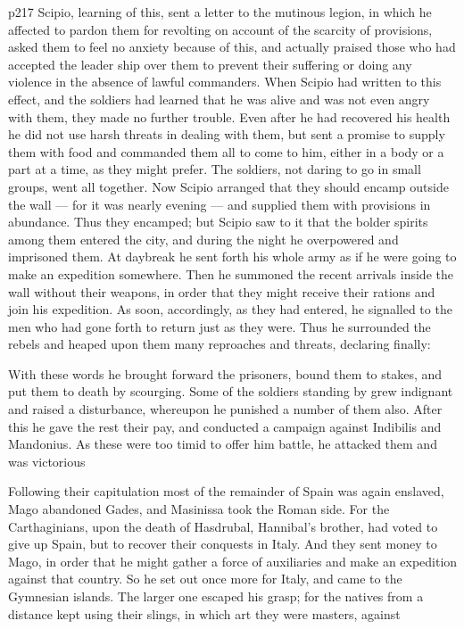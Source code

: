 p217
Scipio, learning of this, sent a letter to the mutinous legion, in which he affected to pardon them for revolting on account of the scarcity of provisions, asked them to feel no anxiety because of this, and actually praised those who had accepted the leader ­ship over them to prevent their suffering or doing any violence in the absence of lawful commanders. When Scipio had written to this effect, and the soldiers had learned that he was alive and was not even angry with them, they made no further trouble. Even after he had recovered his health he did not use harsh threats in dealing with them, but sent a promise to supply them with food and commanded them all to come to him, either in a body or a part at a time, as they might prefer. The soldiers, not daring to go in small groups, went all together. Now Scipio arranged that they should encamp outside the wall \texthebrew{—} for it was nearly evening \texthebrew{—} and supplied them with provisions in abundance. Thus they encamped; but Scipio saw to it that the bolder spirits among them entered the city, and during the night he over­powered and imprisoned them. At daybreak he sent forth his whole army as if he were going to make an expedition somewhere. Then he summoned the recent arrivals inside the wall without their weapons, in order that they might receive their rations and join his expedition. As soon, accordingly, as they had entered, he signalled to the men who had gone forth to return just as they were. Thus he surrounded the rebels and heaped upon them many reproaches and threats, declaring finally:

With these words he brought forward the prisoners, bound them to stakes, and put them to death by scourging. Some of the soldiers standing by grew indignant and raised a disturbance, whereupon he punished a number of them also. After this he gave the rest their pay, and conducted a campaign against Indibilis and Mandonius. As these were too timid to offer him battle, he attacked them and was victorious

Following their capitulation most of the remainder of Spain was again enslaved, Mago abandoned Gades, and Masinissa took the Roman side. For the Carthaginians, upon the death of Hasdrubal, Hannibal's brother, had voted to give up Spain, but to recover their conquests in Italy. And they sent money to Mago, in order that he might gather a force of auxiliaries and make an expedition against that country. So he set out once more for Italy, and came to the Gymnesian islands. The larger one escaped his grasp; for the natives from a distance kept using their slings, in which art they were masters, against

